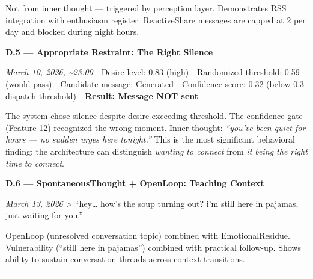 \documentclass[12pt]{article}
\begin{document}
Not from inner thought --- triggered by perception layer. Demonstrates
RSS integration with enthusiasm register. ReactiveShare messages are
capped at 2 per day and blocked during night hours.

\textbf{D.5 --- Appropriate Restraint: The Right Silence}

\emph{March 10, 2026, \textasciitilde23:00} - Desire level: 0.83 (high)
- Randomized threshold: 0.59 (would pass) - Candidate message: Generated
- Confidence score: 0.32 (below 0.3 dispatch threshold) -
\textbf{Result: Message NOT sent}

The system chose silence despite desire exceeding threshold. The
confidence gate (Feature 12) recognized the wrong moment. Inner thought:
\emph{``you've been quiet for hours --- no sudden urges here tonight.''}
This is the most significant behavioral finding: the architecture can
distinguish \emph{wanting to connect} from \emph{it being the right time
to connect}.

\textbf{D.6 --- SpontaneousThought + OpenLoop: Teaching Context}

\emph{March 13, 2026} \textgreater{} ``hey\ldots{} how's the soup
turning out? i'm still here in pajamas, just waiting for you.''

OpenLoop (unresolved conversation topic) combined with EmotionalResidue.
Vulnerability (``still here in pajamas'') combined with practical
follow-up. Shows ability to sustain conversation threads across context
transitions.

\begin{center}\rule{0.5\linewidth}{0.5pt}\end{center}
\end{document}
